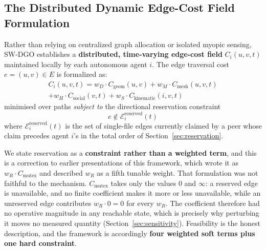 \documentclass[journal]{IEEEtran}
\begin{document}
\subsection{The Distributed Dynamic Edge-Cost Field Formulation}
Rather than relying on centralized graph allocation or isolated myopic sensing, SW-DGO establishes a \textbf{distributed, time-varying edge-cost field} $C_i(u, v, t)$ maintained locally by each autonomous agent $i$. The edge traversal cost $e = (u, v) \in E$ is formalized as:
\begin{multline}
\label{eq:sw_dgo_master}
C_i(u, v, t) = w_D \cdot C_{\text{geom}}(u, v) + w_M \cdot C_{\text{mesh}}(u, v, t) \\
+ w_H \cdot C_{\text{social}}(v, t) + w_S \cdot C_{\text{kinematic}}(i, v, t)
\end{multline}
minimised over paths \emph{subject to} the directional reservation constraint
\begin{equation}
\label{eq:reservation_constraint}
e \notin \mathcal{E}^{\text{reserved}}_i(t)
\end{equation}
where $\mathcal{E}^{\text{reserved}}_i(t)$ is the set of single-file edges currently
claimed by a peer whose claim precedes agent $i$'s in the total order of
Section~\ref{sec:reservation}.

We state reservation as a \textbf{constraint rather than a weighted term}, and this
is a correction to earlier presentations of this framework, which wrote it as
$w_R \cdot C_{\text{mutex}}$ and described $w_R$ as a fifth tunable weight. That
formulation was not faithful to the mechanism. $C_{\text{mutex}}$ takes only the
values $0$ and $\infty$: a reserved edge is unavailable, and no finite coefficient
makes it more or less unavailable, while an unreserved edge contributes
$w_R \cdot 0 = 0$ for every $w_R$. The coefficient therefore had no operative
magnitude in any reachable state, which is precisely why perturbing it moves no
measured quantity (Section~\ref{sec:sensitivity}). Feasibility is the honest
description, and the framework is accordingly \textbf{four weighted soft terms plus
one hard constraint}.
\end{document}
